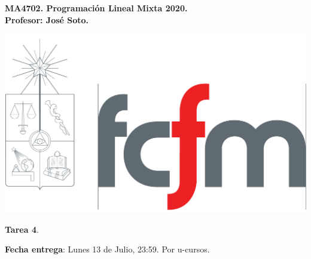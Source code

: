 \documentclass{article}
\theoremstyle{plain}
\theoremstyle{definition}
\theoremstyle{Azul}
\begin{document}
\setlength{\headheight}{14pt}
\vspace*{-1.2 cm}
\begin{minipage}{0.6\textwidth}
	\begin{flushleft}
		\hspace*{-0.5cm}\textbf{MA4702. Programación Lineal Mixta 2020.}\\
		\hspace*{-0.5cm}\textbf{Profesor: José Soto.}\\
	\end{flushleft}
\end{minipage}
\begin{minipage}{0.36\textwidth}
	\begin{flushright}
		\includegraphics[scale=0.15]{fcfm.pdf}
	\end{flushright}
\end{minipage}
\bigskip

\newif\ifsol
\soltrue
\solfalse

\begin{center}
  \LARGE \textbf{Tarea 4}.\\
\end{center}
\bigskip

\noindent\textbf{Fecha entrega}: Lunes 13 de Julio, 23:59. Por u-cursos.
\end{document}

